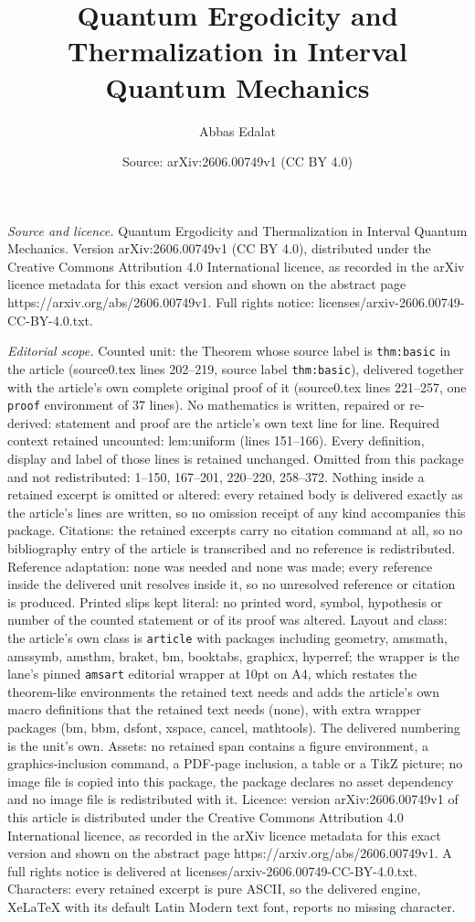 \documentclass[10pt,a4paper]{amsart}
\title[Quantum Ergodicity and Thermalization in Interval Quantum Me]{Quantum Ergodicity and Thermalization in Interval Quantum Mechanics}
\author{Abbas Edalat}
\date{Source: arXiv:2606.00749v1 (CC BY 4.0)}
\begin{document}
\maketitle

\noindent\emph{Source and licence.} Quantum Ergodicity and Thermalization in Interval Quantum Mechanics. Version arXiv:2606.00749v1 (CC BY 4.0), distributed under the Creative Commons Attribution 4.0 International licence, as recorded in the arXiv licence metadata for this exact version and shown on the abstract page https://arxiv.org/abs/2606.00749v1. Full rights notice: licenses/arxiv-2606.00749-CC-BY-4.0.txt.\par\smallskip

\noindent\textit{Editorial scope.} Counted unit: the Theorem whose source label is \texttt{thm:basic} in the article (source0.tex lines 202--219, source label \texttt{thm:basic}), delivered together with the article's own complete original proof of it (source0.tex lines 221--257, one \texttt{proof} environment of 37 lines). No mathematics is written, repaired or re-derived: statement and proof are the article's own text line for line. Required context retained uncounted: lem:uniform (lines 151--166). Every definition, display and label of those lines is retained unchanged. Omitted from this package and not redistributed: 1--150, 167--201, 220--220, 258--372. Nothing inside a retained excerpt is omitted or altered: every retained body is delivered exactly as the article's lines are written, so no omission receipt of any kind accompanies this package. Citations: the retained excerpts carry no citation command at all, so no bibliography entry of the article is transcribed and no reference is redistributed. Reference adaptation: none was needed and none was made; every reference inside the delivered unit resolves inside it, so no unresolved reference or citation is produced. Printed slips kept literal: no printed word, symbol, hypothesis or number of the counted statement or of its proof was altered. Layout and class: the article's own class is \texttt{article} with packages including geometry, amsmath, amssymb, amsthm, braket, bm, booktabs, graphicx, hyperref; the wrapper is the lane's pinned \texttt{amsart} editorial wrapper at 10pt on A4, which restates the theorem-like environments the retained text needs and adds the article's own macro definitions that the retained text needs (none), with extra wrapper packages (bm, bbm, dsfont, xspace, cancel, mathtools). The delivered numbering is the unit's own. Assets: no retained span contains a figure environment, a graphics-inclusion command, a PDF-page inclusion, a table or a TikZ picture; no image file is copied into this package, the package declares no asset dependency and no image file is redistributed with it. Licence: version arXiv:2606.00749v1 of this article is distributed under the Creative Commons Attribution 4.0 International licence, as recorded in the arXiv licence metadata for this exact version and shown on the abstract page https://arxiv.org/abs/2606.00749v1. A full rights notice is delivered at licenses/arxiv-2606.00749-CC-BY-4.0.txt. Characters: every retained excerpt is pure ASCII, so the delivered engine, XeLaTeX with its default Latin Modern text font, reports no missing character.
\end{document}
